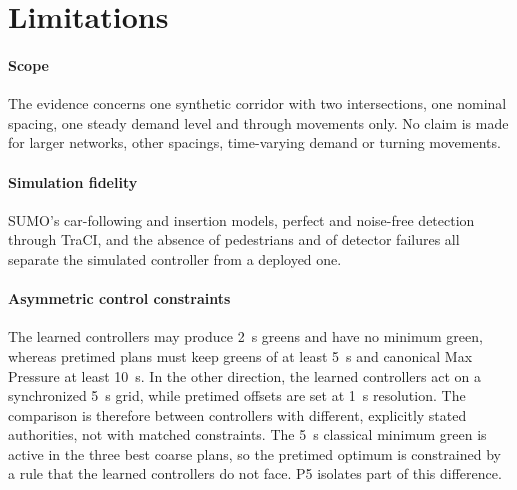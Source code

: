 \documentclass[review,12pt]{elsarticle}
\begin{document}
\section{Limitations}
\label{sec:limitations}

\paragraph{Scope} The evidence concerns one synthetic corridor with two
intersections, one nominal spacing, one steady demand level and through
movements only. No claim is made for larger networks, other spacings,
time-varying demand or turning movements.

\paragraph{Simulation fidelity} SUMO's car-following and insertion
models, perfect and noise-free detection through TraCI, and the absence
of pedestrians and of detector failures all separate the simulated
controller from a deployed one.

\paragraph{Asymmetric control constraints} The learned controllers may
produce 2~s greens and have no minimum green, whereas pretimed plans
must keep greens of at least 5~s and canonical Max Pressure at least
10~s. In the other direction, the learned controllers act on a
synchronized 5~s grid, while pretimed offsets are set at 1~s
resolution. The comparison is therefore between controllers with
different, explicitly stated authorities, not with matched constraints.
The 5~s classical minimum green is active in the three best coarse
plans, so the pretimed optimum is constrained by a rule that the learned
controllers do not face.
P5 isolates part of this difference.
\end{document}
